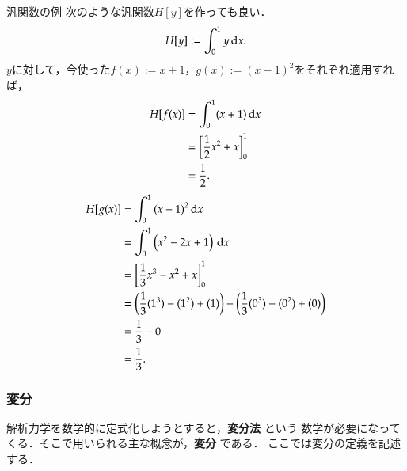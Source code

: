 \begin{mysmallsec}{汎関数の例}
                    次のような汎関数$H[y]$を作っても良い．
                    \begin{align*}
                        H[y] := \int_{0}^{1} y \,\mathrm{d} x.
                    \end{align*}
                    $y$に対して，今使った$f(x):=x + 1$，$g(x):={(x - 1)}^{2}$をそれぞれ適用すれば，
                    \begin{align*}
                        H[f(x)] &= \int_{0}^{1} (x + 1) \,\mathrm{d} x                       \\
                                &= {\left[ \frac{1}{2} {x}^{2} + x \right]}_{0}^{1} \\
                                &= \frac{1}{2}.
                    \end{align*}
                    \begin{align*}
                        H[g(x)] &= \int_{0}^{1} {(x - 1)}^{2} \,\mathrm{d} x \\
                                &= \int_{0}^{1} \left( {x}^{2} - 2 x + 1 \right) \,\mathrm{d} x \\
                                &= {\left[ \frac{1}{3} {x}^{3} - {x}^{2} + x\right]}_{0}^{1} \\
                                &= \left( \frac{1}{3}({1}^{3}) - ({1}^{2}) + {(1)} \right) - \left( \frac{1}{3}({0}^{3}) - ({0}^{2}) + {(0)} \right)  \\
                                &= \frac{1}{3} - 0 \\
                                &= \frac{1}{3}.
                    \end{align*}
                \end{mysmallsec}
            \subsubsection{変分}
                解析力学を数学的に定式化しようとすると，\textbf{変分法} という
                数学が必要になってくる．そこで用いられる主な概念が，\textbf{変分} である．
                ここでは変分の定義を記述する．

